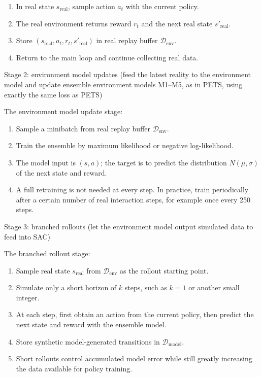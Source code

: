 \begin{enumerate}
\def\labelenumi{\arabic{enumi}.}
\tightlist
\item
  In real state \(s_{\mathrm{real}}\), sample action \(a_t\) with the current policy.
\item
  The real environment returns reward \(r_t\) and the next real state \(s'_{\mathrm{real}}\).
\item
  Store \((s_{\mathrm{real}},a_t,r_t,s'_{\mathrm{real}})\) in real replay buffer \(\mathcal D_{\mathrm{env}}\).
\item
  Return to the main loop and continue collecting real data.
\end{enumerate}

Stage 2: environment model updates (feed the latest reality to the environment model and update ensemble environment models M1--M5, as in PETS, using exactly the same loss as PETS)

The environment model update stage:

\begin{enumerate}
\def\labelenumi{\arabic{enumi}.}
\tightlist
\item
  Sample a minibatch from real replay buffer \(\mathcal D_{\mathrm{env}}\).
\item
  Train the ensemble by maximum likelihood or negative log-likelihood.
\item
  The model input is \((s,a)\); the target is to predict the distribution \(N(\mu,\sigma)\) of the next state and reward.
\item
  A full retraining is not needed at every step. In practice, train periodically after a certain number of real interaction steps, for example once every 250 steps.
\end{enumerate}

Stage 3: branched rollouts (let the environment model output simulated data to feed into SAC)

The branched rollout stage:

\begin{enumerate}
\def\labelenumi{\arabic{enumi}.}
\tightlist
\item
  Sample real state \(s_{\mathrm{real}}\) from \(\mathcal D_{\mathrm{env}}\) as the rollout starting point.
\item
  Simulate only a short horizon of \(k\) steps, such as \(k=1\) or another small integer.
\item
  At each step, first obtain an action from the current policy, then predict the next state and reward with the ensemble model.
\item
  Store synthetic model-generated transitions in \(\mathcal D_{\mathrm{model}}\).
\item
  Short rollouts control accumulated model error while still greatly increasing the data available for policy training.
\end{enumerate}

